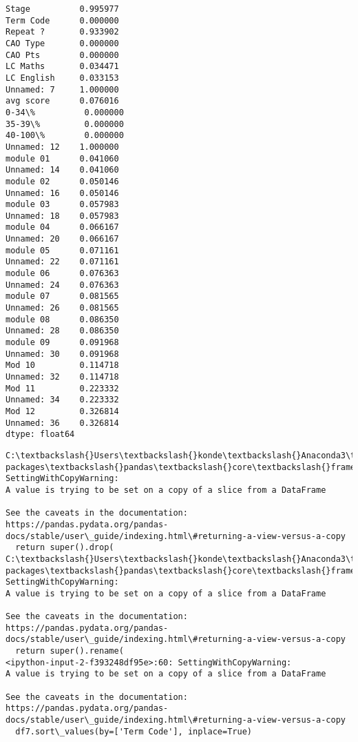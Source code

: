 \documentclass[11pt]{article}
\begin{document}
    \begin{Verbatim}[commandchars=\\\{\}]
Stage          0.995977
Term Code      0.000000
Repeat ?       0.933902
CAO Type       0.000000
CAO Pts        0.000000
LC Maths       0.034471
LC English     0.033153
Unnamed: 7     1.000000
avg score      0.076016
0-34\%          0.000000
35-39\%         0.000000
40-100\%        0.000000
Unnamed: 12    1.000000
module 01      0.041060
Unnamed: 14    0.041060
module 02      0.050146
Unnamed: 16    0.050146
module 03      0.057983
Unnamed: 18    0.057983
module 04      0.066167
Unnamed: 20    0.066167
module 05      0.071161
Unnamed: 22    0.071161
module 06      0.076363
Unnamed: 24    0.076363
module 07      0.081565
Unnamed: 26    0.081565
module 08      0.086350
Unnamed: 28    0.086350
module 09      0.091968
Unnamed: 30    0.091968
Mod 10         0.114718
Unnamed: 32    0.114718
Mod 11         0.223332
Unnamed: 34    0.223332
Mod 12         0.326814
Unnamed: 36    0.326814
dtype: float64
    \end{Verbatim}

    \begin{Verbatim}[commandchars=\\\{\}]
C:\textbackslash{}Users\textbackslash{}konde\textbackslash{}Anaconda3\textbackslash{}lib\textbackslash{}site-packages\textbackslash{}pandas\textbackslash{}core\textbackslash{}frame.py:3990:
SettingWithCopyWarning:
A value is trying to be set on a copy of a slice from a DataFrame

See the caveats in the documentation: https://pandas.pydata.org/pandas-
docs/stable/user\_guide/indexing.html\#returning-a-view-versus-a-copy
  return super().drop(
C:\textbackslash{}Users\textbackslash{}konde\textbackslash{}Anaconda3\textbackslash{}lib\textbackslash{}site-packages\textbackslash{}pandas\textbackslash{}core\textbackslash{}frame.py:4125:
SettingWithCopyWarning:
A value is trying to be set on a copy of a slice from a DataFrame

See the caveats in the documentation: https://pandas.pydata.org/pandas-
docs/stable/user\_guide/indexing.html\#returning-a-view-versus-a-copy
  return super().rename(
<ipython-input-2-f393248df95e>:60: SettingWithCopyWarning:
A value is trying to be set on a copy of a slice from a DataFrame

See the caveats in the documentation: https://pandas.pydata.org/pandas-
docs/stable/user\_guide/indexing.html\#returning-a-view-versus-a-copy
  df7.sort\_values(by=['Term Code'], inplace=True)
    \end{Verbatim}
\end{document}
